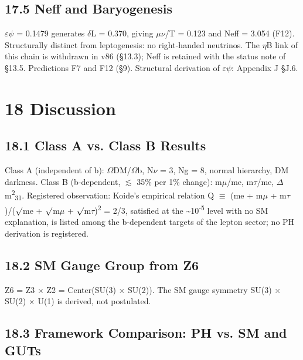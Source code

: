 \documentclass[11pt,letterpaper]{article}
\begin{document}
\subsection*{17.5  Neff and Baryogenesis}

\noindent $\varepsilon$$\psi$ = 0.1479 generates $\delta$L = 0.370, giving $\mu$$\nu$/T = 0.123 and Neff = 3.054 (F12). Structurally distinct from leptogenesis: no right-handed neutrinos. The $\eta$B link of this chain is withdrawn in v86 (§13.3); Neff is retained with the status note of §13.5. Predictions F7 and F12 (§9). Structural derivation of $\varepsilon$$\psi$: Appendix J §J.6.

\section*{18  Discussion}

\subsection*{18.1  Class A vs. Class B Results}

\noindent Class A (independent of b): $\Omega$DM/$\Omega$b, N$\nu$ = 3, Ng = 8, normal hierarchy, DM darkness. Class B (b-dependent, $\lesssim$ 35\% per 1\% change): m$\mu$/me, m$\tau$/me, $\Delta$m\textsuperscript{2}\textsubscript{31}. Registered observation: Koide's empirical relation Q $\equiv$ (me + m$\mu$ + m$\tau$)/($\surd$me + $\surd$m$\mu$ + $\surd$m$\tau$)\textsuperscript{2} = 2/3, satisfied at the \textasciitilde{}10\textsuperscript{-5} level with no SM explanation, is listed among the b-dependent targets of the lepton sector; no PH derivation is registered.

\subsection*{18.2  SM Gauge Group from Z6}

\noindent Z6 = Z3 $\times$ Z2 = Center(SU(3) $\times$ SU(2)). The SM gauge symmetry SU(3) $\times$ SU(2) $\times$ U(1) is derived, not postulated.

\subsection*{18.3  Framework Comparison: PH vs. SM and GUTs}
\end{document}
